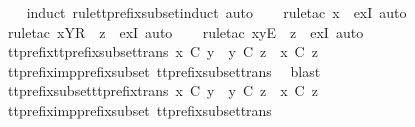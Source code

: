 \begin{isabellebody}
%
\isadelimproof
\ \ %
\endisadelimproof
%
\isatagproof
{}\isamarkupfalse%
\ {\isacharparenleft}induct\ rule{\isacharcolon}tt{\isacharunderscore}prefix{\isacharunderscore}subset{\isachardot}induct{\isacharcomma}\ auto{\isacharparenright}\isanewline
\ \ \isamarkupfalse%
\ {\isacharparenleft}rule{\isacharunderscore}tac\ x{\isacharequal}{\isachardoublequoteopen}{\isacharbrackleft}{\isacharbrackright}{\isachardoublequoteclose}\ \ exI{\isacharcomma}\ auto{\isacharparenright}\isanewline
\ \ \isamarkupfalse%
\ {\isacharparenleft}rule{\isacharunderscore}tac\ x{\isacharequal}{\isachardoublequoteopen}{\isacharbrackleft}Y{\isacharbrackright}\isactrlsub R\ {\isacharhash}\ z{\isachardoublequoteclose}\ \ exI{\isacharcomma}\ auto{\isacharparenright}\isanewline
\ \ \isamarkupfalse%
\ {\isacharparenleft}rule{\isacharunderscore}tac\ x{\isacharequal}{\isachardoublequoteopen}{\isacharbrackleft}y{\isacharbrackright}\isactrlsub E\ {\isacharhash}\ z{\isachardoublequoteclose}\ \ exI{\isacharcomma}\ auto{\isacharparenright}\isanewline
\ \ \isamarkupfalse%
%
\endisatagproof
{\isafoldproof}%
%
\isadelimproof
\isanewline
%
\endisadelimproof
\isanewline
{}\isamarkupfalse%
\ tt{\isacharunderscore}prefix{\isacharunderscore}tt{\isacharunderscore}prefix{\isacharunderscore}subset{\isacharunderscore}trans{\isacharcolon}\ {\isachardoublequoteopen}x\ {\isasymle}\isactrlsub C\ y\ {\isasymLongrightarrow}\ y\ {\isasymlesssim}\isactrlsub C\ z\ {\isasymLongrightarrow}\ x\ {\isasymlesssim}\isactrlsub C\ z{\isachardoublequoteclose}\isanewline
%
\isadelimproof
\ \ %
\endisadelimproof
%
\isatagproof
{}\isamarkupfalse%
\ tt{\isacharunderscore}prefix{\isacharunderscore}imp{\isacharunderscore}prefix{\isacharunderscore}subset\ tt{\isacharunderscore}prefix{\isacharunderscore}subset{\isacharunderscore}trans\ \isamarkupfalse%
\ blast%
\endisatagproof
{\isafoldproof}%
%
\isadelimproof
\isanewline
%
\endisadelimproof
\ \isanewline
{}\isamarkupfalse%
\ tt{\isacharunderscore}prefix{\isacharunderscore}subset{\isacharunderscore}tt{\isacharunderscore}prefix{\isacharunderscore}trans{\isacharcolon}\ {\isachardoublequoteopen}x\ {\isasymlesssim}\isactrlsub C\ y\ {\isasymLongrightarrow}\ y\ {\isasymle}\isactrlsub C\ z\ {\isasymLongrightarrow}\ x\ {\isasymlesssim}\isactrlsub C\ z{\isachardoublequoteclose}\isanewline
%
\isadelimproof
\ \ %
\endisadelimproof
%
\isatagproof
{}\isamarkupfalse%
\ tt{\isacharunderscore}prefix{\isacharunderscore}imp{\isacharunderscore}prefix{\isacharunderscore}subset\ tt{\isacharunderscore}prefix{\isacharunderscore}subset{\isacharunderscore}trans\ \isamarkupfalse%

\end{isabellebody}
